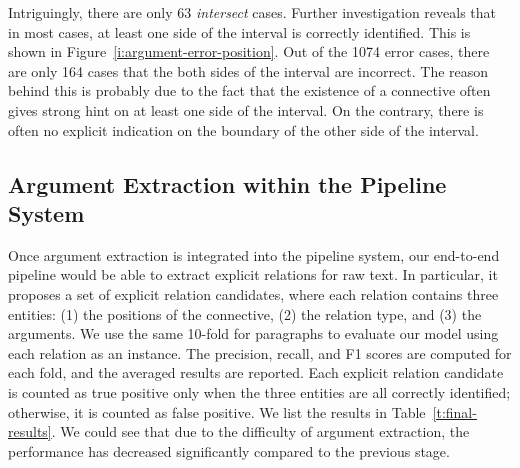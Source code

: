 

Intriguingly, there are only 63 \textit{intersect} cases. Further investigation
reveals that in most cases, at least one side of the interval is correctly
identified. This is shown in Figure~\ref{i:argument-error-position}. Out of
the 1074 error cases, there are only 164 cases that the both sides of the
interval are incorrect. The reason behind this is probably due to the fact that
the existence of a connective often gives strong hint on at least one side of
the interval. On the contrary, there is often no explicit indication on the boundary
of the other side of the interval.



\subsection{Argument Extraction within the Pipeline System}

Once argument extraction is integrated into the pipeline system, our end-to-end
pipeline would be able to extract explicit relations for raw text. In particular,
it proposes a set of explicit relation candidates, where each relation contains
three entities: (1) the positions of the connective, (2) the relation type, and
(3) the arguments. We use the same 10-fold for paragraphs to evaluate our model
using each relation
as an instance. The precision, recall, and F1 scores are computed for each fold,
and the averaged results are reported. Each explicit relation candidate is
counted as true positive only when the three entities are all correctly
identified; otherwise, it is counted as false positive. We list the results
in Table~\ref{t:final-results}. We could see that due to the difficulty
of argument extraction, the performance has decreased significantly compared
to the previous stage.


